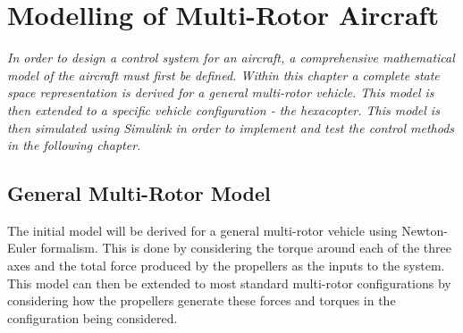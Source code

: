 
\chapter{Modelling of Multi-Rotor Aircraft}\label{chapter:Modelling}
\textit{In order to design a control system for an aircraft, a comprehensive mathematical model of the aircraft must first be defined. Within this chapter a complete state space representation is derived for a general multi-rotor vehicle. This model is then extended to a specific vehicle configuration - the hexacopter. This model is then simulated using Simulink in order to implement and test the control methods in the following chapter.}
\section{General Multi-Rotor Model}\label{section:MultiRotorModel}
The initial model will be derived for a general multi-rotor vehicle using Newton-Euler formalism. This is done by considering the torque around each of the three axes and the total force produced by the propellers as the inputs to the system. This model can then be extended to most standard multi-rotor configurations by considering how the propellers generate these forces and torques in the configuration being considered.



